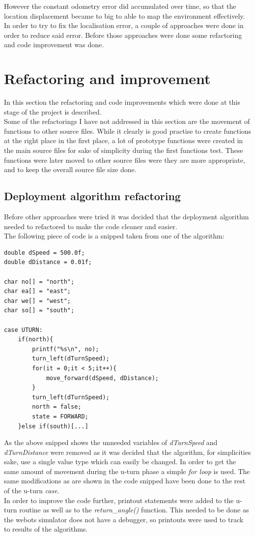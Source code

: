 However the constant odometry error did accumulated over time, so that the location displacement became to big to able to map the environment effectively. \\
In order to try to fix the localisation error, a couple of approaches were done in order to reduce said error. Before those approaches were done some refactoring and code improvement was done.

\section{Refactoring and improvement}
In this section the refactoring and code improvements which were done at this stage of the project is described. \\
Some of the refactorings I have not addressed in this section are the movement of functions to other source files.
While it clearly is good practise to create functions at the right place in the first place, a lot of prototype functions were created in the main source files for sake of simplicity during the first functions test. These functions were later moved to other source files were they are more appropriate, and to keep the overall source file size done. 

\subsection{Deployment algorithm refactoring}
Before other approaches were tried it was decided that the deployment algorithm needed to refactored to make the code cleaner and easier. \\
The following piece of code is a snipped taken from one of the algorithm:

\begin{lstlisting}[caption={Deployment algorithm refactoring}]
double dSpeed = 500.0f;
double dDistance = 0.01f;

char no[] = "north";
char ea[] = "east";
char we[] = "west";
char so[] = "south";

case UTURN:
	if(north){
		printf("%s\n", no);
		turn_left(dTurnSpeed);
		for(it = 0;it < 5;it++){
			move_forward(dSpeed, dDistance);
		}
		turn_left(dTurnSpeed);
		north = false;
		state = FORWARD;
	}else if(south)[...]
\end{lstlisting}

As the above snipped shows the unneeded variables of \textit{dTurnSpeed} and \textit{dTurnDistance} were removed as it was decided that the algorithm, for simplicities sake, use a single value type which can easily be changed. In order to get the same amount of movement during the u-turn phase a simple \textit{for loop} is used. The same modifications as are shown in the code snipped have been done to the rest of the u-turn \textit{case}. \\
In order to improve the code further, printout statements were added to the u-turn routine as well as to the \textit{return\_angle()} function.
This needed to be done as the webots simulator does not have a debugger, so printouts were used to track to results of the algorithms.

